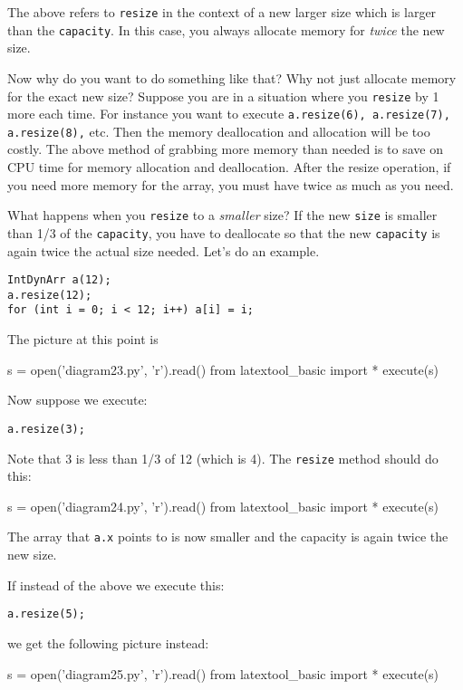 The above refers to \verb!resize! in the context of a new larger size which 
is larger than the \verb!capacity!.
In this case, you always allocate memory for \textit{twice} the new size.

Now why do you want to do something like that? Why not just allocate memory for the 
exact new size? Suppose you are in a situation where you \verb!resize! by 1 more each time. 
For instance you want to execute \verb!a.resize(6), a.resize(7), a.resize(8),! etc. 
Then the memory deallocation and allocation will be too costly. The above method of 
grabbing more memory than needed is to save on CPU time for memory allocation and deallocation. 
After the resize operation, if you need more memory for the array, you must have twice 
as much as you need.

What happens when you \verb!resize! to a \textit{smaller} size? If 
the new \verb!size! is smaller than 1/3 of the \verb!capacity!, you have to deallocate 
so that the new \verb!capacity! is again twice the actual size needed. Let's do an example.

\begin{Verbatim}[frame=single]
IntDynArr a(12);
a.resize(12);  
for (int i = 0; i < 12; i++) a[i] = i;
\end{Verbatim}

The picture at this point is
\begin{python}
s = open('diagram23.py', 'r').read()
from latextool_basic import *
execute(s)
\end{python}

Now suppose we execute:
\begin{Verbatim}[frame=single]
a.resize(3);
\end{Verbatim}
Note that 3 is less than 1/3 of 12 (which is 4).
The \verb!resize! method should do this:
\begin{python}
s = open('diagram24.py', 'r').read()
from latextool_basic import *
execute(s)
\end{python}
The array that \verb!a.x! points to
is now smaller and the capacity is again
twice the new size.

If instead of the above we execute this:
\begin{Verbatim}[frame=single]
a.resize(5);
\end{Verbatim}
we get the following picture instead:
\begin{python}
s = open('diagram25.py', 'r').read()
from latextool_basic import *
execute(s)
\end{python}

